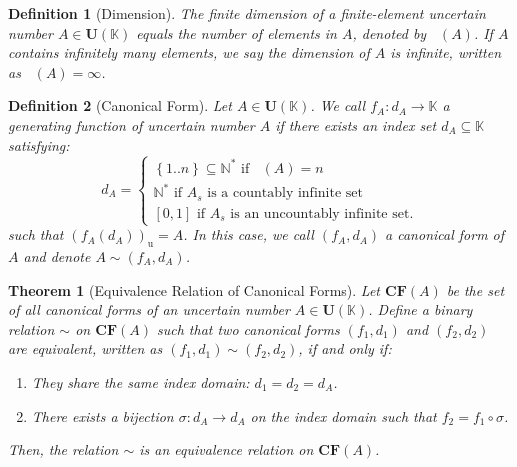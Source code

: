 \documentclass[a4paper,12pt, twoside]{memoir}
\newtheorem{definition}{Definition}[chapter]
\newtheorem{theorem}{Theorem}[chapter]
\DeclareMathOperator{\dimU}{\dim_U}
\newcommand{\set}[1]{\left\{#1\right\}} %
\newcommand{\bd}[1]{\left(#1\right)_\mathrm{u}} %
\newcommand{\tsbd}[1]{\mathbf{U}(\mathbb{#1})}
\begin{document}
\begin{definition}[Dimension]
	The finite dimension of a finite-element uncertain number $A \in \tsbd{K}$ equals the number of elements in $A$, denoted by $\dimU(A)$. If $A$ contains infinitely many elements, we say the dimension of $A$ is infinite, written as $\dimU(A) = \infty$.
\end{definition}

\begin{definition}[Canonical Form]
	Let $A \in \tsbd{K}$. We call $f_A : d_A \to \mathbb{K}$ a generating function of uncertain number $A$ if there exists an index set $d_A \subseteq \mathbb{K}$ satisfying:
	\[d_A = \begin{cases*}
			\set{1..n} \subseteq \mathbb{N^*} \text{ if } \dimU(A)=n           \\
			\mathbb{N^*} \text{ if } A_s \text{ is a countably infinite set  } \\
			[0,1] \text{ if } A_s \text{ is an uncountably infinite set.}
		\end{cases*}\]
	such that $\bd{f_A(d_A)}= A$. In this case, we call $(f_A,d_A)$ a canonical form of $A$ and denote $A \sim (f_A,d_A)$.
\end{definition}

\begin{theorem}[Equivalence Relation of Canonical Forms]
	\label{thm:canonical_form_equivalence}
	Let $\mathbf{CF}(A)$ be the set of all canonical forms of an uncertain number $A \in \tsbd{K}$. Define a binary relation $\sim$ on $\mathbf{CF}(A)$ such that two canonical forms $(f_1, d_1)$ and $(f_2, d_2)$ are equivalent, written as $(f_1, d_1) \sim (f_2, d_2)$, if and only if:
	\begin{enumerate}[leftmargin=*]
		\item They share the same index domain: $d_1 = d_2 = d_A$.
		\item There exists a bijection $\sigma : d_A \to d_A$ on the index domain such that $f_2 = f_1 \circ \sigma$.
	\end{enumerate}
	Then, the relation $\sim$ is an equivalence relation on $\mathbf{CF}(A)$.
\end{theorem}
\end{document}
